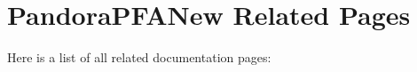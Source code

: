 \section{Pandora\-PFANew Related Pages}
Here is a list of all related documentation pages:\begin{CompactList}
\item {}

\end{CompactList}
